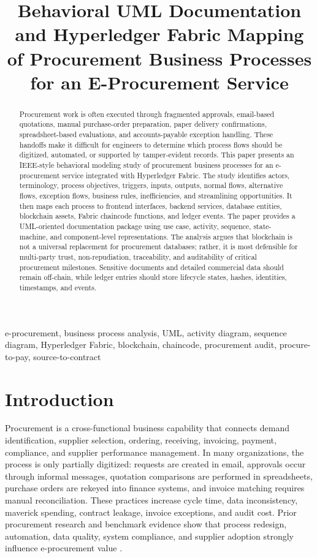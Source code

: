 \documentclass[conference]{IEEEtran}
\title{Behavioral UML Documentation and Hyperledger Fabric Mapping of Procurement Business Processes for an E-Procurement Service}
\author{\IEEEauthorblockN{Harith Irfan}
\IEEEauthorblockA{Independent Research Draft\\
Email: asynashen@gmail.com}}
\begin{document}
\maketitle

\begin{abstract}
Procurement work is often executed through fragmented approvals, email-based quotations, manual purchase-order preparation, paper delivery confirmations, spreadsheet-based evaluations, and accounts-payable exception handling. These handoffs make it difficult for engineers to determine which process flows should be digitized, automated, or supported by tamper-evident records. This paper presents an IEEE-style behavioral modeling study of procurement business processes for an e-procurement service integrated with Hyperledger Fabric. The study identifies actors, terminology, process objectives, triggers, inputs, outputs, normal flows, alternative flows, exception flows, business rules, inefficiencies, and streamlining opportunities. It then maps each process to frontend interfaces, backend services, database entities, blockchain assets, Fabric chaincode functions, and ledger events. The paper provides a UML-oriented documentation package using use case, activity, sequence, state-machine, and component-level representations. The analysis argues that blockchain is not a universal replacement for procurement databases; rather, it is most defensible for multi-party trust, non-repudiation, traceability, and auditability of critical procurement milestones. Sensitive documents and detailed commercial data should remain off-chain, while ledger entries should store lifecycle states, hashes, identities, timestamps, and events.
\end{abstract}

\begin{IEEEkeywords}
e-procurement, business process analysis, UML, activity diagram, sequence diagram, Hyperledger Fabric, blockchain, chaincode, procurement audit, procure-to-pay, source-to-contract
\end{IEEEkeywords}

\section{Introduction}
Procurement is a cross-functional business capability that connects demand identification, supplier selection, ordering, receiving, invoicing, payment, compliance, and supplier performance management. In many organizations, the process is only partially digitized: requests are created in email, approvals occur through informal messages, quotation comparisons are performed in spreadsheets, purchase orders are rekeyed into finance systems, and invoice matching requires manual reconciliation. These practices increase cycle time, data inconsistency, maverick spending, contract leakage, invoice exceptions, and audit cost. Prior procurement research and benchmark evidence show that process redesign, automation, data quality, system compliance, and supplier adoption strongly influence e-procurement value \cite{croom2007,vaidya2006,brandon2011,apqc2019,worldbank2023}.
\end{document}
